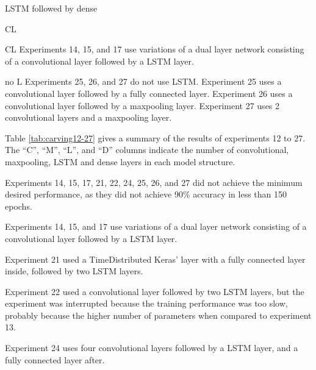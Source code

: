 LSTM followed by dense

CL



CL
Experiments 14, 15, and 17 use variations of a dual layer network consisting of a convolutional layer followed by a LSTM layer.


no L
Experiments 25, 26, and 27 do not use LSTM. Experiment 25 uses a convolutional layer followed by a fully connected layer. Experiment 26 uses a convolutional layer followed by a maxpooling layer. Experiment 27 uses 2 convolutional layers and a maxpooling layer.



Table \ref{tab:carving12-27} gives a summary of the results of experiments 12 to 27. The ``C'', ``M'', ``L'', and ``D'' columns indicate the number of convolutional, maxpooling, LSTM and dense layers in each model structure.



Experiments 14, 15, 17, 21, 22, 24, 25, 26, and 27 did not achieve the minimum desired performance, as they did not achieve 90\% accuracy in less than 150 epochs.

Experiments 14, 15, and 17 use variations of a dual layer network consisting of a convolutional layer followed by a LSTM layer.

Experiment 21 used a TimeDistributed Keras' layer with a fully connected layer inside, followed by two LSTM layers.

Experiment 22 used a convolutional layer followed by two LSTM layers, but the experiment was interrupted because the training performance was too slow, probably because the higher number of parameters when compared to experiment 13.

Experiment 24 uses four convolutional layers followed by a LSTM layer, and a fully connected layer after.

